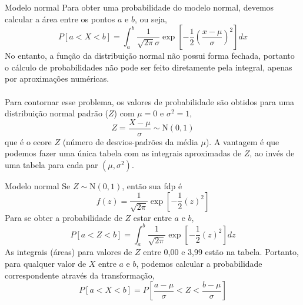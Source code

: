 \documentclass[10pt]{beamer}\usepackage[]{graphicx}\usepackage[]{color}
\providecommand{\N}{\text{N}}
\theoremstyle{definition}
\begin{document}
\begin{frame}[fragile]{Modelo normal}
  Para obter uma probabilidade do modelo normal, devemos calcular a área
  entre os pontos $a$ e $b$, ou seja,
  \begin{equation*}
    P[a < X < b] = \int_a^b \frac{1}{\sqrt{2\pi}\sigma} \exp\left[-\frac{1}{2}
      \left( \frac{x - \mu}{\sigma}\right)^2\right] dx
  \end{equation*}
  No entanto, a função da distribuição normal não possui forma
  fechada, portanto o cálculo de probabilidades não pode ser feito
  diretamente pela integral, apenas por aproximações numéricas. \\~\\
  Para contornar esse problema, os valores de probabilidade são
  obtidos para uma distribuição normal padrão ($Z$) com $\mu = 0$ e
  $\sigma^2 = 1$,
  \begin{equation*}
    Z = \frac{X - \mu}{\sigma} \sim \text{N}(0,1)
  \end{equation*}
  que é o ecore $Z$ (número de desvios-padrões da média $\mu$). A
  vantagem é que podemos fazer uma única tabela com as integrais
  aproximadas de $Z$, ao invés de uma tabela para cada par
  $(\mu,\sigma^2)$.
\end{frame}

\begin{frame}[fragile]{Modelo normal}
  Se $Z \sim \N(0,1)$, então sua fdp é
  \begin{equation*}
    f(z) = \frac{1}{\sqrt{2\pi}} \exp\left[-\frac{1}{2} (z)^2 \right]
  \end{equation*}
  Para se obter a probabilidade de $Z$ estar entre $a$ e $b$,
  \begin{equation*}
    P[a < Z < b] = \int_a^b \frac{1}{\sqrt{2\pi}} \exp\left[-\frac{1}{2}
      (z)^2 \right] dz
  \end{equation*}
  As integrais (áreas) para valores de $Z$ entre 0,00 e 3,99 estão na
  tabela. Portanto, para qualquer valor de $X$ entre $a$ e $b$, podemos
  calcular a probabilidade correspondente através da transformação,
  \begin{equation*}
    P[a < X < b] = P\left[\frac{a - \mu}{\sigma} < Z < \frac{b
        - \mu}{\sigma}\right]
  \end{equation*}
\end{frame}
\end{document}
